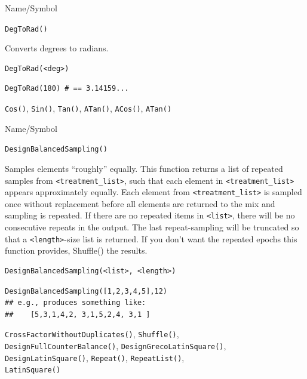 \begin{desc}{Name/Symbol}
\item[Name/Symbol]  	\verb+DegToRad()+

\item[Description]  	Converts degrees to radians.

\item[Usage]
\begin{verbatim}
DegToRad(<deg>)
\end{verbatim}

\item[Example]     	
\begin{verbatim}
DegToRad(180) # == 3.14159...
\end{verbatim}

\item[See Also]    	\verb+Cos()+, \verb+Sin()+, \verb+Tan()+, \verb+ATan()+, \verb+ACos()+, \verb+ATan()+ 
\end{desc}





\begin{desc}{Name/Symbol}
\item[Name/Symbol]  	\verb+DesignBalancedSampling()+

\item[Description] 	Samples elements ``roughly'' equally.
  		This function returns a list of repeated samples from
 		\verb+<treatment_list>+, such that each element in \verb+<treatment_list>+ 
		appears approximately equally.  Each element from 
		\verb+<treatment_list>+ is sampled once without replacement before 
		all elements are returned to the mix and sampling is repeated.  
		If there are no repeated items in \verb+<list>+, there will be no
 		consecutive repeats in the output.  The last repeat-sampling 
		will be truncated so that a \verb+<length>+-size list is returned.  
		If you don't want the repeated epochs this function provides, 
		Shuffle() the results.

\item[Usage]
\begin{verbatim}
DesignBalancedSampling(<list>, <length>)
\end{verbatim}

\item[Example]
\begin{verbatim}
DesignBalancedSampling([1,2,3,4,5],12)
## e.g., produces something like:
##    [5,3,1,4,2, 3,1,5,2,4, 3,1 ]
\end{verbatim}

\item[See Also]	\verb+CrossFactorWithoutDuplicates()+,
  \verb+Shuffle()+,\\ \verb+DesignFullCounterBalance()+,
  		\verb+DesignGrecoLatinSquare()+, \\
\verb+DesignLatinSquare()+, \verb+Repeat()+, 
		\verb+RepeatList()+,  \\\verb+LatinSquare()+

\end{desc}






